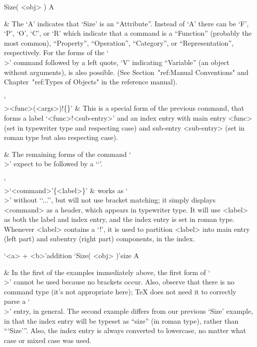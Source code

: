 \begintt 
\>Size( <obj> ) A
\endtt

  & The `A' indicates that `Size' is an  ``Attribute''.  Instead  of  `A'
    there can be `F', `P', `O', `C', or `R' which indicate that a command
    is  a  ``Function''  (probably  the   most   common),   ``Property'',
    ``Operation'', ``Category'', or ``Representation'', respectively. For
    the forms of  the  `\\>'  command  followed  by  a  left  quote,  `V'
    indicating  ``Variable''  (an  object  without  arguments),  is  also
    possible.     (See     Section~"ref:Manual      Conventions"      and
    Chapter~"ref:Types of Objects" in the reference manual).

`\\><func>(<args>)!\{<sub-entry>\}' &
    This is a special form of the previous command, that  forms  a  label
    `<func>!<sub-entry>' and an index entry with main entry  <func>  (set
    in typewriter type and respecting  case)  and  sub-entry  <sub-entry>
    (set in roman type but also respecting case).

  & The remaining forms of the command `\\>' expect to be followed by a
    `\lq'.

`\\>\lq<command>\rq\{<label>\}' &
    works  as  `\\>'  without  `\lq...\rq',  but  will  not  use  bracket
    matching; it simply displays <command> as a header, which appears  in
    typewriter type. It will use <label> as  both  the  label  and  index
    entry, and the index entry is set in  roman  type.  Whenever  <label>
    contains a `!', it is used to partition <label> into main entry (left
    part) and subentry (right part) components, in the index.

\begintt
\>`<a> + <b>'{addition}
\>`Size( <obj> )'{size} A
\endtt

  & In the first of the examples immediately above,  the  first  form  of
    `\\>' cannot be used because no brackets occur.  Also,  observe  that
    there is no command type (it's not appropriate here); {\TeX} does not
    need it to correctly parse a `\\>'  entry,  in  general.  The  second
    example differs from our previous `Size' example, in that  the  index
    entry will be typeset  as  ``size''  (in  roman  type),  rather  than
    ``{`Size'}''. Also, the index entry is always converted to lowercase,
    no matter what case or mixed case was used.

